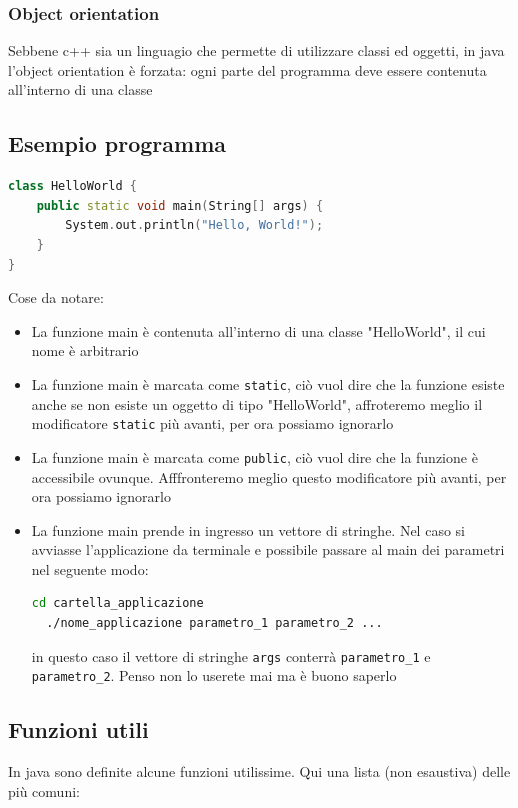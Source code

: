 \subsubsection{Object orientation}
Sebbene c++ sia un linguagio che permette di utilizzare classi ed oggetti, in java l'object orientation è forzata: ogni parte del programma deve essere contenuta all'interno di una classe

\subsection{Esempio programma}
\begin{lstlisting}[language = c++, frame = none]
class HelloWorld {
    public static void main(String[] args) {
        System.out.println("Hello, World!"); 
    }
}
\end{lstlisting}

Cose da notare:
\begin{itemize}
	\item La funzione main è contenuta all'interno di una classe "HelloWorld", il cui nome è arbitrario
	\item La funzione main è marcata come \verb|static|, ciò vuol dire che la funzione esiste anche se non esiste un oggetto di tipo "HelloWorld", affroteremo meglio il modificatore \verb|static| più avanti, per ora possiamo ignorarlo
	\item La funzione main è marcata come \verb|public|, ciò vuol dire che la funzione è accessibile ovunque. Afffronteremo meglio questo modificatore più avanti, per ora possiamo ignorarlo
	\item La funzione main prende in ingresso un vettore di stringhe. Nel caso si avviasse l'applicazione da terminale e possibile passare al main dei parametri nel seguente modo:
	      \begin{lstlisting}[language = bash, frame = none]
  cd cartella_applicazione 
  ./nome_applicazione parametro_1 parametro_2 ... \end{lstlisting}
	      in questo caso il vettore di stringhe \verb|args| conterrà \verb|parametro_1| e \verb|parametro_2|. Penso non lo userete mai ma è buono saperlo
\end{itemize}
\subsection{Funzioni utili}
In java sono definite alcune funzioni utilissime. Qui una lista (non esaustiva) delle più comuni:

